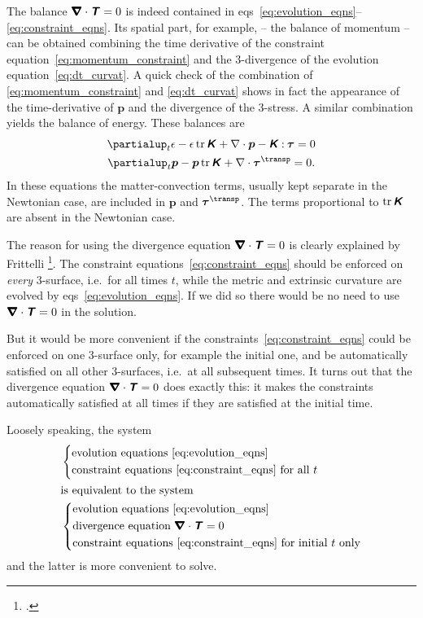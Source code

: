 \documentclass[\ifafour a4paper,12pt,\else a5paper,10pt,\fi%
onecolumn,oneside,article,%
british%
]{memoir}
\theoremstyle{remark}
\theoremstyle{innote}
\newcommand*{\mathte}[1]{\textbf{\textit{\textsf{#1}}}}
\newcommand*{\citey}{\footcites}%
\newcommand*{\de}{\partialup}%
\DeclareMathOperator{\tr}{tr}%
\newcommand*{\con}{\mathbin{:}}%
\renewcommand*{\|}[1][]{\nonscript\,#1\vert\nonscript\;\mathopen{}}
\newcommand*{\eqns}{eqs}%
\newcommand*{\ie}{{i.e.}}
\newcommand*{\T}{^\transp}%
\newcommand*{\yTT}{\tau}
\newcommand*{\yT}{\bm{\yTT}}
\newcommand*{\yTTf}{T}
\newcommand*{\yTf}{\mathte{\yTTf}}
\newcommand*{\yKK}{K}
\newcommand*{\yK}{\mathte{\yKK}}
\newcommand*{\ypp}{p}
\newcommand*{\yp}{\bm{\ypp}}
\newcommand*{\ye}{\epsilon}
\newcommand*{\ynab}{\nabla}
\newcommand*{\yDi}{\pmb{\bm{\nabla}}}
\begin{document}
The balance $\yDi\cdot\yTf = 0$ is indeed contained in
\eqns~\eqref{eq:evolution_eqns}--\eqref{eq:constraint_eqns}. Its spatial
part, for example, -- the balance of momentum -- can be obtained combining
the time derivative of the constraint
equation~\eqref{eq:momentum_constraint} and the 3-divergence of the
evolution equation~\eqref{eq:dt_curvat}. A quick check of the combination
of \eqref{eq:momentum_constraint} and \eqref{eq:dt_curvat} shows in fact
the appearance of the time-derivative of $\yp$ and the divergence of the
3-stress. A similar combination yields the balance of energy. These
balances are
\begin{subequations}\label{eq:evolution_energy_momentum}
  \begin{gather}
    \label{eq:dt_energy}
    \de_t \ye - \ye\tr\yK + \ynab\cdot\yp - \yK\con\yT =0
    \\
    \label{eq:dt_momentum}
    \de_t \yp -  \yp\tr\yK + \ynab\cdot\yT\T =0.
  \end{gather}
\end{subequations}
In these equations the matter-convection terms, usually kept separate in the
Newtonian case, are included in $\yp$ and $\yT\T$. The terms proportional
to $\tr\yK$ are absent in the Newtonian case.

The reason for using the divergence equation $\yDi\cdot\yTf = 0$ is clearly
explained by Frittelli \citey{frittelli1997}. The constraint
equations~\eqref{eq:constraint_eqns} should be enforced on \emph{every}
3-surface, \ie\ for all times $t$, while the metric and extrinsic curvature
are evolved by \eqns~\eqref{eq:evolution_eqns}. If we did so there would be
no need to use $\yDi\cdot\yTf = 0$ in the solution.

But it would be more convenient if the
constraints~\eqref{eq:constraint_eqns} could be enforced on one 3-surface
only, for example the initial one, and be automatically satisfied on all
other 3-surfaces, \ie\ at all subsequent times. It turns out that the
divergence equation $\yDi\cdot\yTf = 0$ does exactly this: it makes the
constraints automatically satisfied at all times if they are satisfied at
the initial time.

Loosely speaking, the system
\begin{align*}
  &\left\{\begin{aligned}
  &\text{evolution equations~\eqref{eq:evolution_eqns}} \\
  &\text{constraint equations~\eqref{eq:constraint_eqns} for all $t$}
  \end{aligned}\right.
  \\
  \shortintertext{is equivalent to the system}
  &\left\{\begin{aligned}
  &\text{evolution equations~\eqref{eq:evolution_eqns}} \\
  &\text{divergence equation $\yDi\cdot\yTf = 0$} \\
  &\text{constraint equations~\eqref{eq:constraint_eqns} for initial $t$ only}
  \end{aligned}\right.
\end{align*}
and the latter is more convenient to solve.
\end{document}
